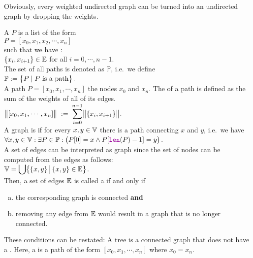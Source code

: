 Obviously, every weighted undirected graph can be turned into an undirected graph by dropping the weights.

\noindent
A  $P$ is a list of the form 
\\[0.2cm]
\hspace*{1.3cm} 
$P = [ x_0, x_1, x_2, \cdots, x_n ]$ 
\\[0.2cm]
such that we have : \\[0.2cm]
\hspace*{1.3cm}
$\{x_i,x_{i+1}\} \in {\mathbb E}$  \quad for all $i = 0, \cdots, n-1$.
\\[0.2cm]
The set of all paths is denoted as $\mathbb{P}$, i.e.~we define
\\[0.2cm]
\hspace*{1.3cm}
$\displaystyle \mathbb{P}  := \bigl\{ P \mid \mbox{$P$ is a path} \bigr\}$.
\\[0.2cm]
A path $P = [ x_0, x_1, \cdots, x_n]$  the nodes $x_0$ and $x_n$.  The  of a
path is defined as
the sum of the weights of all of its edges.  
\\[0.2cm]
\hspace*{1.3cm}
 $\displaystyle\bigl\|[x_0,x_1, \cdots, x_n]\bigr\| \;:=\; \sum\limits_{i=0}^{n-1} \bigl\|\{x_i,x_{i+1}\}\bigr\|$. 
\\[0.2cm]
A graph is  if for every $x,y \in {\mathbb V}$ there is a path connecting $x$ and $y$, i.e.~we have
\\[0.2cm]
\hspace*{1.3cm}
$\forall x, y \in \mathbb{V}: \exists P \in \mathbb{P}: \bigl(P[0] = x \wedge P[\mytt{len}(P)-1] = y\bigr)$.
\\[0.2cm]
A set of edges can be interpreted as graph since the set of nodes can be computed from the edges as
follows: 
\\[0.2cm]
\hspace*{1.3cm}
$\displaystyle{\mathbb V} = \bigcup \bigl\{\{x,y\} \,\big|\, \{x,y\} \in {\mathbb E} \bigr\}$.
\\[0.2cm]
Then, a set of edges ${\mathbb E}$ is called a  if and only if
\begin{enumerate}[(a)]
\item the corresponding graph is connected \quad \textbf{and}
\item removing any edge from ${\mathbb E}$ would result in a graph that is no longer connected.
\end{enumerate}
These conditions can be restated: A tree is a connected graph that does not have a .
Here, a  is a path of the form $[x_0, x_1, \cdots, x_n]$ where $x_0 = x_n$.  

